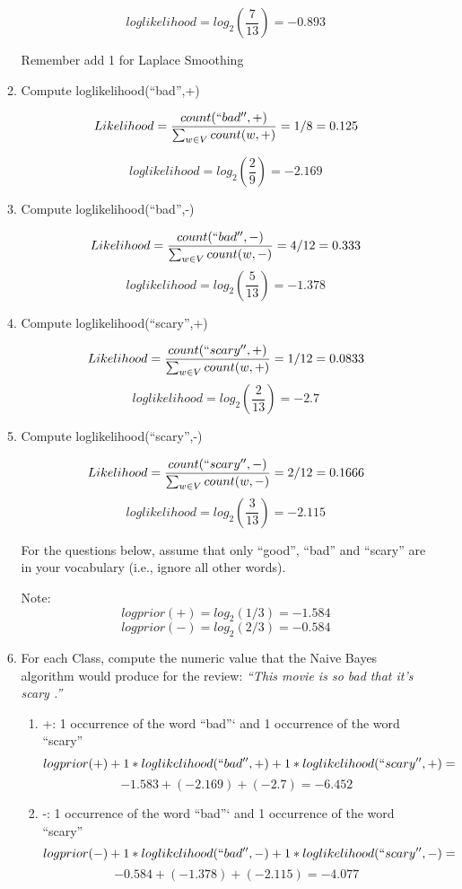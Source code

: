\documentclass[11pt]{article}
\begin{document}
\begin{enumerate}
\begin{enumerate}
$$loglikelihood = log_2 (\frac{7}{13}) = -0.893$$

Remember add 1 for Laplace Smoothing

\item Compute loglikelihood(``bad'',+)

$$Likelihood = \frac{count(``bad'', +)}{\sum_{w \in V} count(w, +)} = 1/8 = 0.125$$

$$loglikelihood = log_2 (\frac{2}{9}) = -2.169$$

\item Compute loglikelihood(``bad'',-)

$$Likelihood = \frac{count(``bad'', -)}{\sum_{w \in V} count(w, -)} = 4/12 = 0.333$$
$$loglikelihood = log_2 (\frac{5}{13}) = -1.378$$

\item Compute loglikelihood(``scary'',+)

$$Likelihood = \frac{count(``scary'', +)}{\sum_{w \in V} count(w, +)} = 1/12 = 0.0833$$
$$loglikelihood = log_2 (\frac{2}{13}) = -2.7$$

\item Compute loglikelihood(``scary'',-)

$$Likelihood = \frac{count(``scary'', -)}{\sum_{w \in V} count(w, -)} = 2/12 = 0.1666$$
$$loglikelihood = log_2 (\frac{3}{13}) = -2.115$$

\vspace*{.1in}
  For the questions below, assume that only ``good'', ``bad'' and
  ``scary'' are in your vocabulary (i.e., ignore all other words).

  Note: 
  $$logprior(+) = log_2(1/3) = -1.584$$
  $$logprior(-) = log_2(2/3) = -0.584$$

\item For each Class, compute the numeric value that the Naive Bayes algorithm would
  produce for the review: {\it ``This movie is so bad that it's scary .''}
  
  \begin{enumerate}
  \item +: 1 occurrence of the word ``bad''` and 1 occurrence of the word ``scary''
  $$logprior(+) + 1*loglikelihood(``bad'', +) + 1 * loglikelihood(``scary'', +) =$$
  $$ -1.583 + (-2.169) + (-2.7) = -6.452$$
  \item -: 1 occurrence of the word ``bad''` and 1 occurrence of the word ``scary''
  $$logprior(-) + 1*loglikelihood(``bad'', -) + 1 * loglikelihood(``scary'', -) =$$
  $$ -0.584 + (-1.378) + (-2.115) = -4.077$$
  \end{enumerate}
  


\end{enumerate}
\end{enumerate}
\end{document}
